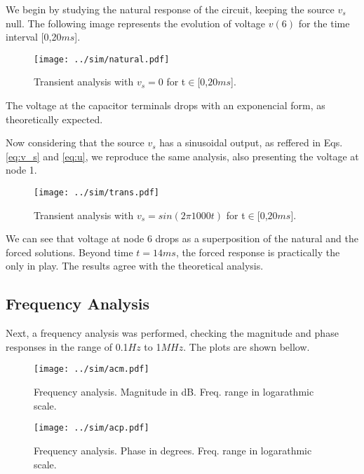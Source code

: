 \par We begin by studying the natural response of the circuit, keeping the source $v_s$ null. The following image represents the evolution of voltage $v(6)$ for the time interval [0,20$ms$].

\begin{figure}[H]
  \centering
  \texttt{[image: ../sim/natural.pdf]}
  \caption{Transient analysis with $v_s =0$ for t$\in$[$0$,$20ms$].}
  \label{fig:sim_1}
\end{figure}

The voltage at the capacitor terminals drops with an exponencial form, as theoretically expected.

\par Now considering that the source $v_s$ has a sinusoidal output, as reffered in Eqs. \ref{eq:v_s} and \ref{eq:u}, we reproduce the same analysis, also presenting the voltage at node 1.


\begin{figure}[H]
  \centering
  \texttt{[image: ../sim/trans.pdf]}
  \caption{Transient analysis with $v_s = sin(2\pi 1000 t)$ for t$\in$[$0$,$20ms$].}
  \label{fig:sim_2}
\end{figure}

\par We can see that voltage at node 6 drops as a superposition of the natural and the forced solutions. Beyond time $t=14ms$, the forced response is practically the only in play. The results agree with the theoretical analysis.

\subsection{Frequency Analysis}

\par Next, a frequency analysis was performed, checking the magnitude and phase responses in the range of 0.1$Hz$ to 1$MHz$. The plots are shown bellow.

\begin{figure}[H]
  \centering
  \texttt{[image: ../sim/acm.pdf]}
  \caption{Frequency analysis. Magnitude in dB. Freq. range in logarathmic scale.}
  \label{fig:sim_3}
\end{figure}

\begin{figure}[H]
  \centering
  \texttt{[image: ../sim/acp.pdf]}
  \caption{Frequency analysis. Phase in degrees. Freq. range in logarathmic scale.}
  \label{fig:sim_3}
\end{figure}

